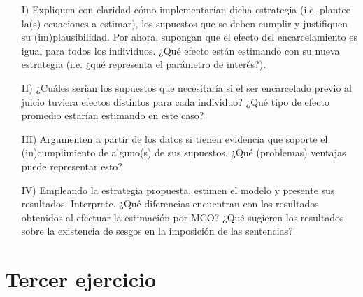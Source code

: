 \documentclass[a4paper]{article}
\begin{document}
\begin{itemize}
    
    \begin{itemize}
        \item[I)] Expliquen con claridad cómo implementarían dicha estrategia (i.e. plantee la(s) ecuaciones a estimar), los supuestos que se deben cumplir y  justifiquen su (im)plausibilidad. Por ahora, supongan que el efecto del encarcelamiento es igual para todos los individuos. ¿Qué efecto están estimando con su nueva estrategia (i.e. ¿qué representa el parámetro de interés?).
        
        \item[II)] ¿Cuáles serían los supuestos que necesitaría si el ser encarcelado previo al juicio tuviera efectos distintos para cada individuo? ¿Qué tipo de efecto promedio estarían estimando en este caso?
        
        \item[III)] Argumenten a partir de los datos si tienen evidencia que soporte el (in)cumplimiento de alguno(s) de sus supuestos. ¿Qué (problemas) ventajas puede representar esto?
        
          \item[IV)] Empleando la estrategia propuesta, estimen el modelo y presente sus resultados. Interprete. ¿Qué diferencias encuentran con los resultados obtenidos al efectuar la estimación por MCO? ¿Qué sugieren los resultados sobre la existencia de sesgos en la imposición de las sentencias?
          
 \end{itemize}

\end{itemize}   

\bigskip



\section*{Tercer ejercicio}
\end{document}
